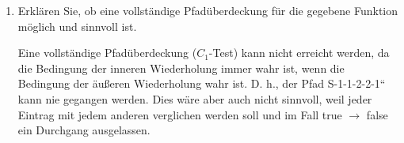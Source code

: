 \documentclass{bschlangaul-aufgabe}
\begin{document}
\begin{enumerate}

\item Erklären Sie, ob eine vollständige Pfadüberdeckung für die gegebene
Funktion möglich und sinnvoll ist.

\begin{bAntwort}
Eine vollständige Pfadüberdeckung ($C_1$-Test) kann nicht erreicht
werden, da die Bedingung der inneren Wiederholung immer wahr ist, wenn
die Bedingung der äußeren Wiederholung wahr ist. D. h., der Pfad
S-1-1-2-2-1“ kann nie gegangen werden. Dies wäre aber auch nicht
sinnvoll, weil jeder Eintrag mit jedem anderen verglichen werden soll
und im Fall true $\rightarrow$ false ein Durchgang ausgelassen.
\end{bAntwort}

\end{enumerate}
\end{document}
